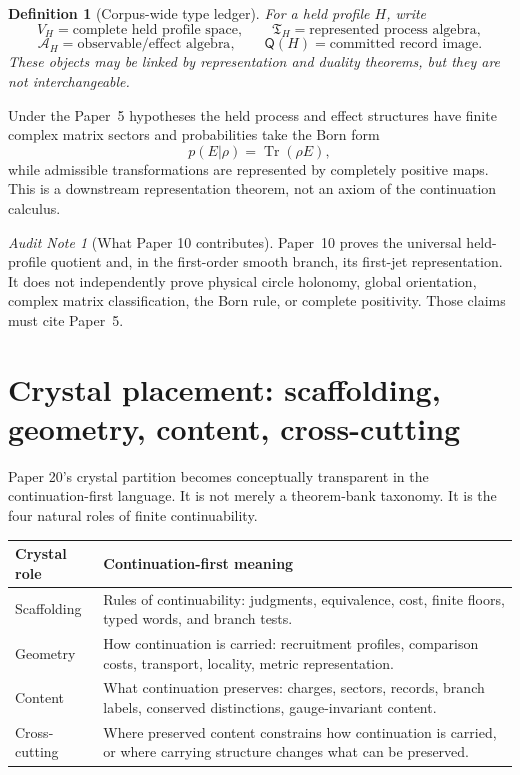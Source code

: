 \documentclass[11pt]{article}
\newtheorem{definition}[theorem]{Definition}
\theoremstyle{remark}
\newtheorem{audit}[theorem]{Audit Note}
\newcommand{\Tr}{\operatorname{Tr}}
\newcommand{\Vh}{V_H}
\newcommand{\Th}{\mathfrak T_H}
\newcommand{\Ah}{\mathcal A_H}
\begin{document}
\begin{definition}[Corpus-wide type ledger]
For a held profile \(H\), write
\[
        \Vh=\text{complete held profile space},\qquad
        \Th=\text{represented process algebra},
\]
\[
        \Ah=\text{observable/effect algebra},\qquad
        \mathsf Q(H)=\text{committed record image}.
\]
These objects may be linked by representation and duality theorems, but they are not interchangeable.
\end{definition}

Under the Paper~5 hypotheses the held process and effect structures have finite complex matrix sectors and probabilities take the Born form
\[
        p(E|\rho)=\Tr(\rho E),
\]
while admissible transformations are represented by completely positive maps.  This is a downstream representation theorem, not an axiom of the continuation calculus.

\begin{audit}[What Paper 10 contributes]
Paper~10 proves the universal held-profile quotient and, in the first-order smooth branch, its first-jet representation.  It does not independently prove physical circle holonomy, global orientation, complex matrix classification, the Born rule, or complete positivity.  Those claims must cite Paper~5.
\end{audit}

\section{Crystal placement: scaffolding, geometry, content, cross-cutting}

Paper 20's crystal partition becomes conceptually transparent in the continuation-first language.  It is not merely a theorem-bank taxonomy.  It is the four natural roles of finite continuability.

\begin{center}
\begin{tabularx}{\textwidth}{p{}X}
\toprule
\textbf{Crystal role} & \textbf{Continuation-first meaning}\\
\midrule
Scaffolding & Rules of continuability: judgments, equivalence, cost, finite floors, typed words, and branch tests.\\
Geometry & How continuation is carried: recruitment profiles, comparison costs, transport, locality, metric representation.\\
Content & What continuation preserves: charges, sectors, records, branch labels, conserved distinctions, gauge-invariant content.\\
Cross-cutting & Where preserved content constrains how continuation is carried, or where carrying structure changes what can be preserved.\\
\bottomrule
\end{tabularx}
\end{center}
\end{document}

